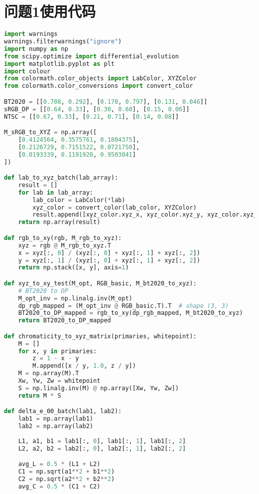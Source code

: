 \section[\hspace{-2pt}问题1使用代码]{{\heiti{} \hspace{-8pt}问题1使用代码}}
\begin{lstlisting}[language=Python]
import warnings
warnings.filterwarnings("ignore")
import numpy as np
from scipy.optimize import differential_evolution
import matplotlib.pyplot as plt
import colour
from colormath.color_objects import LabColor, XYZColor
from colormath.color_conversions import convert_color

BT2020 = [[0.708, 0.292], [0.170, 0.797], [0.131, 0.046]]
sRGB_DP = [[0.64, 0.33], [0.30, 0.60], [0.15, 0.06]]
NTSC = [[0.67, 0.33], [0.21, 0.71], [0.14, 0.08]]

M_sRGB_to_XYZ = np.array([
    [0.4124564, 0.3575761, 0.1804375],
    [0.2126729, 0.7151522, 0.0721750],
    [0.0193339, 0.1191920, 0.9503041]
])

def lab_to_xyz_batch(lab_array):
    result = []
    for lab in lab_array:
        lab_color = LabColor(*lab)
        xyz_color = convert_color(lab_color, XYZColor)
        result.append([xyz_color.xyz_x, xyz_color.xyz_y, xyz_color.xyz_z])
    return np.array(result)

def rgb_to_xy(rgb, M_rgb_to_xyz):
    xyz = rgb @ M_rgb_to_xyz.T
    x = xyz[:, 0] / (xyz[:, 0] + xyz[:, 1] + xyz[:, 2])
    y = xyz[:, 1] / (xyz[:, 0] + xyz[:, 1] + xyz[:, 2])
    return np.stack([x, y], axis=1)

def xyz_to_xy_test(M_opt, RGB_basic, M_bt2020_to_xyz):
    # BT2020 to DP
    M_opt_inv = np.linalg.inv(M_opt)
    dp_rgb_mapped = (M_opt_inv @ RGB_basic.T).T  # shape (3, 3)
    BT2020_to_DP_mapped = rgb_to_xy(dp_rgb_mapped, M_bt2020_to_xyz)
    return BT2020_to_DP_mapped

def chromaticity_to_xyz_matrix(primaries, whitepoint):
    M = []
    for x, y in primaries:
        z = 1 - x - y
        M.append([x / y, 1.0, z / y])
    M = np.array(M).T
    Xw, Yw, Zw = whitepoint
    S = np.linalg.inv(M) @ np.array([Xw, Yw, Zw])
    return M * S

def delta_e_00_batch(lab1, lab2):
    lab1 = np.array(lab1)
    lab2 = np.array(lab2)
    
    L1, a1, b1 = lab1[:, 0], lab1[:, 1], lab1[:, 2]
    L2, a2, b2 = lab2[:, 0], lab2[:, 1], lab2[:, 2]

    avg_L = 0.5 * (L1 + L2)
    C1 = np.sqrt(a1**2 + b1**2)
    C2 = np.sqrt(a2**2 + b2**2)
    avg_C = 0.5 * (C1 + C2)


\end{lstlisting}
